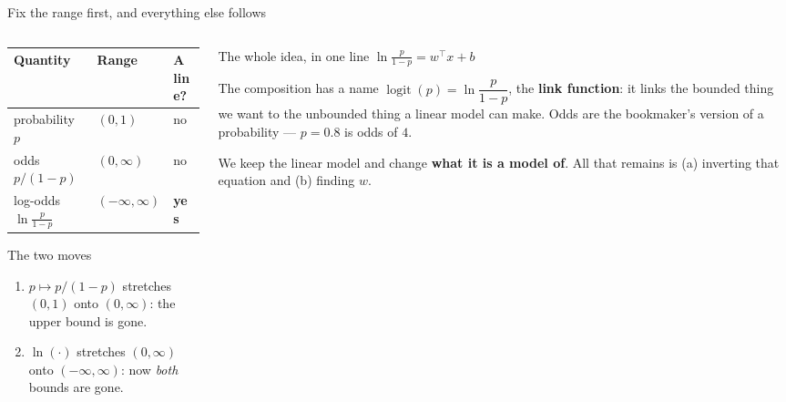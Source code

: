 \documentclass[aspectratio=169]{beamer}
\begin{document}
\begin{frame}[shrink=8]{Fix the range first, and everything else follows}
  \begin{columns}[T]
    \begin{column}{0.50\textwidth}
      \begin{center}\small
      \begin{tabular}{@{}lll@{}}
        \toprule
        \textbf{Quantity} & \textbf{Range} & \textbf{A line?}\\
        \midrule
        probability $p$ & $(0,1)$ & no\\
        odds $p/(1-p)$ & $(0,\infty)$ & no\\
        log-odds $\ln\frac{p}{1-p}$ & $(-\infty,\infty)$ & \textbf{yes}\\
        \bottomrule
      \end{tabular}
      \end{center}
      \begin{block}{The two moves}
        \begin{enumerate}\small
          \item $p \mapsto p/(1-p)$ stretches $(0,1)$ onto $(0,\infty)$:
            the upper bound is gone.
          \item $\ln(\cdot)$ stretches $(0,\infty)$ onto
            $(-\infty,\infty)$: now \emph{both} bounds are gone.
        \end{enumerate}
      \end{block}
    \end{column}
    \begin{column}{0.46\textwidth}
      \begin{exampleblock}{The whole idea, in one line}
        \centering\large
        $\displaystyle \ln\frac{p}{1-p} = w^{\!\top}x + b$
      \end{exampleblock}
      \begin{block}{The composition has a name}
        \small $\operatorname{logit}(p) = \ln\dfrac{p}{1-p}$, the
        \textbf{link function}: it links the bounded thing we want to the
        unbounded thing a linear model can make. Odds are the bookmaker's
        version of a probability --- $p=0.8$ is odds of $4$.
      \end{block}
      \begin{alertblock}{}
        \small We keep the linear model and change \textbf{what it is a
        model of}. All that remains is (a) inverting that equation and
        (b) finding $w$.
      \end{alertblock}
    \end{column}
  \end{columns}
\end{frame}
\end{document}
